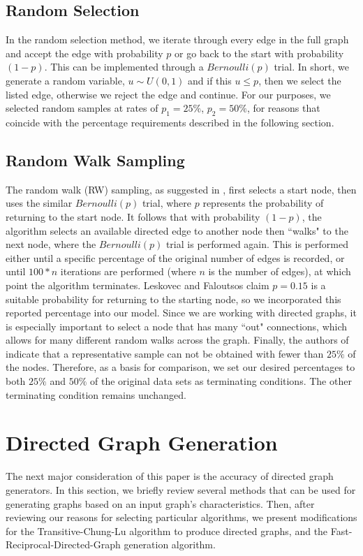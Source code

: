 \documentclass[pdftex,11pt,a4paper,twocolumn]{scrartcl}
\begin{document}
\subsection{Random Selection}
In the random selection method, we iterate through every edge in the full graph and accept the edge with probability $p$ or go back to the start with probability $(1-p)$. This can be implemented through a $Bernoulli(p)$ trial. In short, we generate a random variable, $u \sim U(0,1)$ and if this $u \le p$, then we select the listed edge, otherwise we reject the edge and continue. For our purposes, we selected random samples at rates of $p_1 = 25\%$, $p_2 = 50\%$, for reasons that coincide with the percentage requirements described in the following section.


\subsection{Random Walk Sampling}
The random walk (RW) sampling, as suggested in \cite{sampling}, first selects a start node, then uses the similar $Bernoulli(p)$ trial, where $p$ represents the probability of returning to the start node. It follows that with probability $(1-p)$, the algorithm selects an available directed edge to another node then ``walks" to the next node, where the $Bernoulli(p)$ trial is performed again. This is performed either until a specific percentage of the original number of edges is recorded, or until $100*n$ iterations are performed (where $n$ is the number of edges), at which point the algorithm terminates. Leskovec and Faloutsos claim $p=0.15$ is a suitable probability for returning to the starting node, so we incorporated this reported percentage into our model. Since we are working with directed graphs, it is especially important to select a node that has many ``out" connections, which allows for many different random walks across the graph. Finally, the authors of \cite{sampling} indicate that a representative sample can not be obtained with fewer than $25\%$ of the nodes. Therefore, as a basis for comparison, we set our desired percentages to both $25\%$ and $50\%$ of the original data sets as terminating conditions. The other terminating condition remains unchanged.

\section{Directed Graph Generation}
The next major consideration of this paper is the accuracy of directed graph generators. In this section, we briefly review several methods that can be used for generating graphs based on an input graph's characteristics. Then, after reviewing our reasons for selecting particular algorithms, we present modifications for the Transitive-Chung-Lu algorithm to produce directed graphs, and the Fast-Reciprocal-Directed-Graph generation algorithm.
\end{document}
